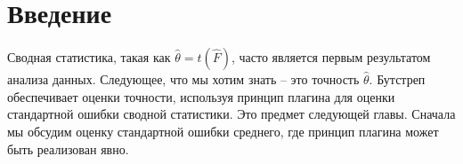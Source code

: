 \section{Введение}

Сводная статистика, такая как $\hat\theta = t (\hat F)$, часто является первым результатом анализа данных. Следующее, что мы хотим знать -- это точность $\hat\theta$. Бутстреп обеспечивает оценки точности, используя принцип плагина для оценки стандартной ошибки сводной статистики. Это предмет следующей главы. Сначала мы обсудим оценку стандартной ошибки среднего, где принцип плагина может быть реализован явно. 